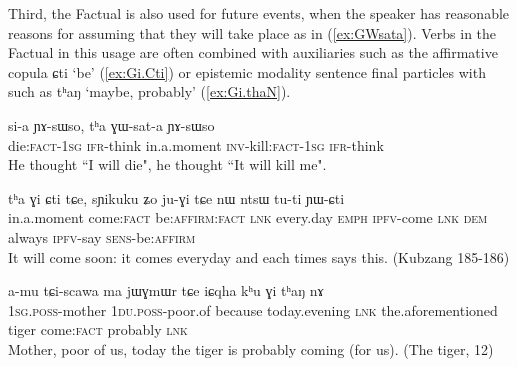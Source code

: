 \documentclass[oldfontcommands,oneside,a4paper,11pt]{article}
\newcommand{\ipa}[1]{{\phon \mbox{#1}}} %
\newcommand{\refb}[1]{(\ref{#1})}
\newcommand{\factual}[1]{\textsc{:fact}}
\begin{document}
Third, the Factual is also used for future events, when the speaker has reasonable reasons for assuming that they will take place as in \refb{ex:GWsata}. Verbs in the Factual in this usage are often combined with auxiliaries such as the affirmative copula \ipa{ɕti} `be' (\ref{ex:Gi.Cti}) or epistemic modality sentence final particles with  such as \ipa{tʰaŋ} `maybe, probably' (\ref{ex:Gi.thaN}).

\begin{exe}
\ex \label{ex:GWsata}
\gll
\ipa{si-a}   \ipa{ɲɤ-sɯso,} \ipa{tʰa}  	\ipa{ɣɯ-sat-a}  \ipa{ɲɤ-sɯso} \\
die:\textsc{fact-1sg} \textsc{ifr}-think in.a.moment \textsc{inv}-kill:\textsc{fact-1sg} \textsc{ifr}-think \\
\glt He thought ``I will die", he thought ``It will kill me".
\end{exe}

\begin{exe}
\ex \label{ex:Gi.Cti}
\gll
 	\ipa{tʰa} 	\ipa{ɣi} 	\ipa{ɕti} 	\ipa{tɕe,} 	\ipa{sɲikuku} 	\ipa{ʑo} 	\ipa{ju-ɣi} 	\ipa{tɕe} 	\ipa{nɯ} 	\ipa{ntsɯ} 	\ipa{tu-ti} 	\ipa{ɲɯ-ɕti} 	\\
 in.a.moment come\factual{} be:\textsc{affirm}\factual{} \textsc{lnk} every.day \textsc{emph} \textsc{ipfv}-come \textsc{lnk} \textsc{dem} always \textsc{ipfv}-say \textsc{sens}-be:\textsc{affirm} \\
\glt It will come  soon: it comes everyday and each times says this. (Kubzang 185-186)
\end{exe}

\begin{exe}
\ex \label{ex:Gi.thaN}
\gll
 \ipa{a-mu} 	\ipa{tɕi-scawa} 	\ipa{ma} 	\ipa{jɯɣmɯr} 	\ipa{tɕe} 	\ipa{iɕqha} 	\ipa{kʰu} 	\ipa{ɣi} 	\ipa{tʰaŋ} 	\ipa{nɤ} 	\\
 \textsc{1sg.poss}-mother  \textsc{1du.poss}-poor.of because today.evening \textsc{lnk} the.aforementioned tiger  come\factual{} probably \textsc{lnk} \\
\glt Mother, poor of us, today the tiger is probably coming (for us). (The tiger, 12)
 \end{exe}

 

 
\end{document}
